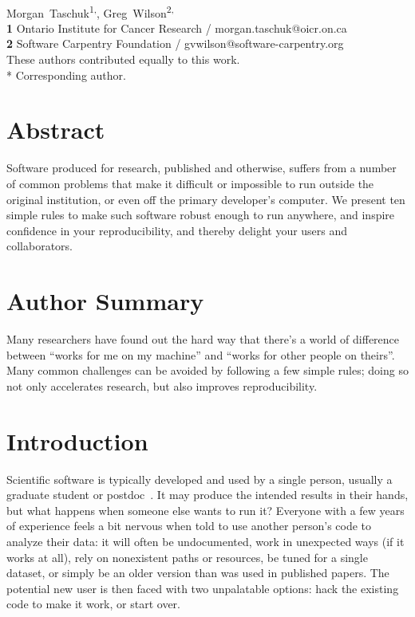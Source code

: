 \documentclass[10pt,letterpaper]{article}
\date{}
\begin{document}
\vspace*{0.2in}

\begin{flushleft}
{\Large
\textbf{}
}
\newline
\\
{Morgan~Taschuk}\textsuperscript{1,\ddag *},
{Greg~Wilson}\textsuperscript{2,\ddag}
\\
\textbf{1} Ontario Institute for Cancer Research / morgan.taschuk@oicr.on.ca
\\
\textbf{2} Software Carpentry Foundation / gvwilson@software-carpentry.org
\\
\bigskip
{\ddag} These authors contributed equally to this work.
\\
* Corresponding author.
\end{flushleft}

\section*{Abstract}

Software produced for research,
published and otherwise,
suffers from a number of common problems
that make it difficult or impossible to run outside the original institution,
or even off the primary developer's computer.
We present ten simple rules to make such software robust enough to run anywhere,
and inspire confidence in your reproducibility,
and thereby delight your users and collaborators.

\section*{Author Summary}

Many researchers have found out the hard way that there's a world of difference
between ``works for me on my machine'' and ``works for other people on theirs''.
Many common challenges can be avoided by following a few simple rules; doing so
not only accelerates research, but also improves reproducibility.

\linenumbers

\section*{Introduction}

Scientific software is typically developed and used by a single person,
usually a graduate student or postdoc~\cite{prins2015}.
It may produce the intended results in their hands,
but what happens when someone else wants to run it? Everyone with
a few years of experience feels a bit nervous when told to use
another person's code to analyze their data:
it will often be undocumented,
work in unexpected ways (if it works at all),
rely on nonexistent paths or resources,
be tuned for a single dataset,
or simply be an older version than was used in published papers.
The potential new user is then faced with two unpalatable options:
hack the existing code to make it work, or start over.
\end{document}

